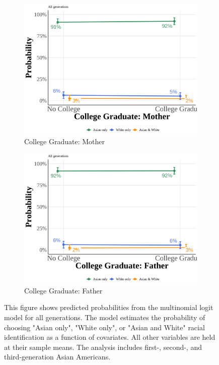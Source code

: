 \begin{center}
\begin{figure}[!htb]
\vspace{0.5cm}

\begin{subfigure}{.48\textwidth}
\caption{College Graduate: Mother}
\centering
\includegraphics[width=1\linewidth]{simple_pp_MomGradCollege_all.png}
\end{subfigure}
\hfill
\begin{subfigure}{.48\textwidth}
\caption{College Graduate: Father}
\centering
\includegraphics[width=1\linewidth]{simple_pp_DadGradCollege_all.png}
\end{subfigure}

\caption*{\footnotesize{This figure shows predicted probabilities from the multinomial logit model for all generations. The model estimates the probability of choosing "Asian only", "White only", or "Asian and White" racial identification as a function of covariates. All other variables are held at their sample means. The analysis includes first-, second-, and third-generation Asian Americans.}}
\end{figure}
\end{center}

